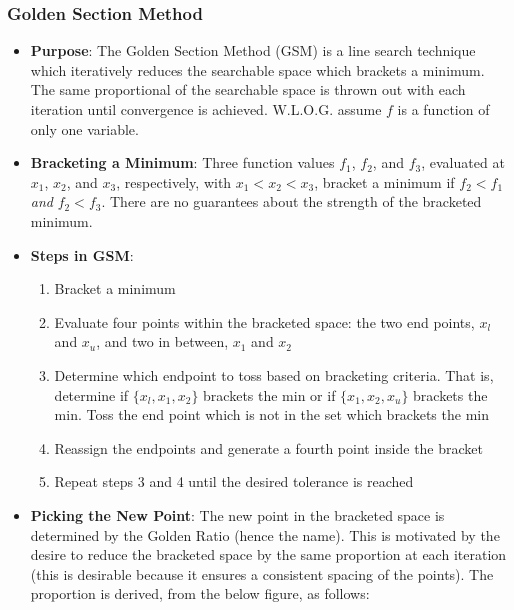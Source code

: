 \documentclass[11pt]{article}
\newcommand{\Item}[1]{\item \textbf{#1}:}
\begin{document}
\subsubsection{Golden Section Method}
\begin{itemize}
\Item{Purpose} The Golden Section Method (GSM) is a line search technique which iteratively reduces the searchable space which brackets a minimum. The same proportional of the searchable space is thrown out with each iteration until convergence is achieved. W.L.O.G. assume $f$ is a function of only one variable.
\Item{Bracketing a Minimum} Three function values $f_1$, $f_2$, and $f_3$, evaluated at $x_1$, $x_2$, and $x_3$, respectively, with $x_1<x_2<x_3$, bracket a minimum if $f_2<f_1$ \emph{and} $f_2<f_3$. There are no guarantees about the strength of the bracketed minimum.
\Item{Steps in GSM}
	\begin{enumerate}
	\item Bracket a minimum
	\item Evaluate four points within the bracketed space: the two end points, $x_l$ and $x_u$, and two in between, $x_1$ and $x_2$
	\item Determine which endpoint to toss based on bracketing criteria. That is, determine if $\{x_l,x_1,x_2\}$ brackets the min or if $\{x_1,x_2,x_u\}$ brackets the min. Toss the end point which is not in the set which brackets the min
	\item Reassign the endpoints and generate a fourth point inside the bracket
	\item Repeat steps 3 and 4 until the desired tolerance is reached
	\end{enumerate}
\Item{Picking the New Point} The new point in the bracketed space is determined by the Golden Ratio (hence the name). This is motivated by the desire to reduce the bracketed space by the same proportion at each iteration (this is desirable because it ensures a consistent spacing of the points). The proportion is derived, from the below figure, as follows:
\begin{figure}[h]\centering

\end{figure}
\end{itemize}
\end{document}
